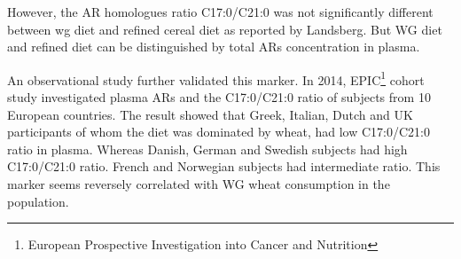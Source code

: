However, the AR homologues ratio C17:0/C21:0 was not significantly different between \acrshort{wg} diet and refined cereal diet as reported by Landsberg\cite{ISI:000255012000007}. But WG diet and refined diet can be distinguished by total ARs concentration in plasma.

An observational study further validated this marker.
In 2014, EPIC\footnote{European Prospective Investigation into Cancer and Nutrition} cohort study investigated plasma ARs and the C17:0/C21:0 ratio of subjects from 10 European countries. 
The result showed that Greek, Italian, Dutch and UK participants of whom the diet was dominated by wheat, had low C17:0/C21:0 ratio in plasma. Whereas Danish, German and Swedish subjects had high C17:0/C21:0 ratio. French and Norwegian subjects had intermediate ratio. This marker seems reversely correlated with WG wheat consumption in the population.




